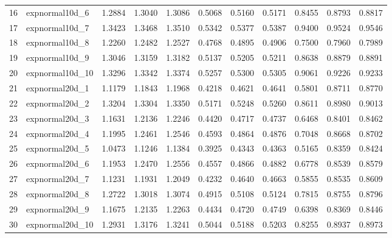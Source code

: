 \begin{table}[ht]
\begin{tabular}{rlrrrrrrrrr}
  16 & expnormal10d\_6 & 1.2884 & 1.3040 & 1.3086 & 0.5068 & 0.5160 & 0.5171 & 0.8455 & 0.8793 & 0.8817 \\ 
  17 & expnormal10d\_7 & 1.3423 & 1.3468 & 1.3510 & 0.5342 & 0.5377 & 0.5387 & 0.9400 & 0.9524 & 0.9546 \\ 
  18 & expnormal10d\_8 & 1.2260 & 1.2482 & 1.2527 & 0.4768 & 0.4895 & 0.4906 & 0.7500 & 0.7960 & 0.7989 \\ 
  19 & expnormal10d\_9 & 1.3046 & 1.3159 & 1.3182 & 0.5137 & 0.5205 & 0.5211 & 0.8638 & 0.8879 & 0.8891 \\ 
  20 & expnormal10d\_10 & 1.3296 & 1.3342 & 1.3374 & 0.5257 & 0.5300 & 0.5305 & 0.9061 & 0.9226 & 0.9233 \\ 
  21 & expnormal20d\_1 & 1.1179 & 1.1843 & 1.1968 & 0.4218 & 0.4621 & 0.4641 & 0.5801 & 0.8711 & 0.8770 \\ 
  22 & expnormal20d\_2 & 1.3204 & 1.3304 & 1.3350 & 0.5171 & 0.5248 & 0.5260 & 0.8611 & 0.8980 & 0.9013 \\ 
  23 & expnormal20d\_3 & 1.1631 & 1.2136 & 1.2246 & 0.4420 & 0.4717 & 0.4737 & 0.6468 & 0.8401 & 0.8462 \\ 
  24 & expnormal20d\_4 & 1.1995 & 1.2461 & 1.2546 & 0.4593 & 0.4864 & 0.4876 & 0.7048 & 0.8668 & 0.8702 \\ 
  25 & expnormal20d\_5 & 1.0473 & 1.1246 & 1.1384 & 0.3925 & 0.4343 & 0.4363 & 0.5165 & 0.8359 & 0.8424 \\ 
  26 & expnormal20d\_6 & 1.1953 & 1.2470 & 1.2556 & 0.4557 & 0.4866 & 0.4882 & 0.6778 & 0.8539 & 0.8579 \\ 
  27 & expnormal20d\_7 & 1.1231 & 1.1931 & 1.2049 & 0.4232 & 0.4640 & 0.4663 & 0.5855 & 0.8535 & 0.8609 \\ 
  28 & expnormal20d\_8 & 1.2722 & 1.3018 & 1.3074 & 0.4915 & 0.5108 & 0.5124 & 0.7815 & 0.8755 & 0.8796 \\ 
  29 & expnormal20d\_9 & 1.1675 & 1.2135 & 1.2263 & 0.4434 & 0.4720 & 0.4749 & 0.6398 & 0.8369 & 0.8446 \\ 
  30 & expnormal20d\_10 & 1.2931 & 1.3176 & 1.3241 & 0.5044 & 0.5188 & 0.5203 & 0.8255 & 0.8937 & 0.8973 \\ 
   \hline
\end{tabular}
\end{table}
